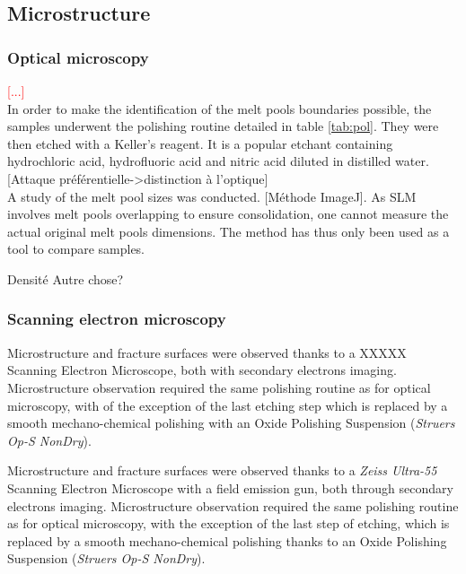 \subsection{Microstructure}

\subsubsection{Optical microscopy}
\label{MMOM}

\textcolor{red}{[...]}\\

In order to make the identification of the melt pools boundaries possible, the samples underwent the polishing routine detailed in table \ref{tab:pol}. They were then etched with	a Keller's reagent. It is a popular etchant containing hydrochloric acid, hydrofluoric acid and nitric acid diluted in distilled water. [Attaque préférentielle->distinction à l'optique] \\

A study of the melt pool sizes was conducted. [Méthode ImageJ]. As SLM involves melt pools overlapping to ensure consolidation, one cannot measure the actual original melt pools dimensions. The method has thus only been used as a tool to compare samples.

Densité
Autre chose?

\subsubsection{Scanning electron microscopy}

Microstructure and fracture surfaces were observed thanks to a XXXXX Scanning Electron Microscope, both with secondary electrons imaging. Microstructure observation required the same polishing routine as for optical microscopy, with of the exception of the last etching step which is replaced by a smooth mechano-chemical polishing with an Oxide Polishing Suspension (\textit{Struers Op-S NonDry}).

Microstructure and fracture surfaces were observed thanks to a \textit{Zeiss Ultra-55} Scanning Electron Microscope with a field emission gun, both through secondary electrons imaging. Microstructure observation required the same polishing routine as for optical microscopy, with the exception of the last step of etching, which is replaced by a smooth mechano-chemical polishing thanks to an Oxide Polishing Suspension (\textit{Struers Op-S NonDry}).\\

